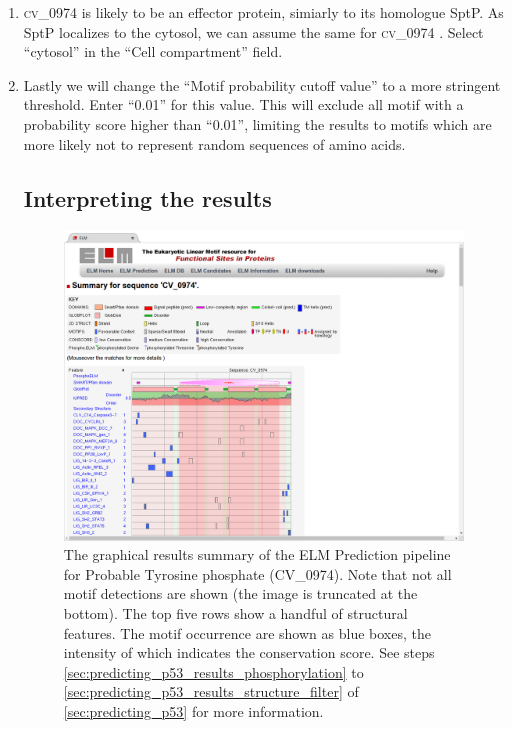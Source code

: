 \documentclass[12pt]{article}
\newcommand\uniprot[1]{%
	\textsc{\lowercase{#1}}%
}
\begin{document}
\begin{enumerate}
	
\item \uniprot{CV\_0974} is likely to be an effector protein, simiarly to its
    homologue SptP. As SptP localizes to the cytosol, we can assume the same
    for \uniprot{CV\_0974}. Select ``cytosol'' in the ``Cell compartment''
    field.

\item Lastly we will change the ``Motif probability cutoff value'' to a more
	stringent threshold. Enter ``0.01'' for this value. This will exclude 
	all motif with a probability score higher than ``0.01'', limiting the
	results to motifs which are more likely not to represent random
	sequences of amino acids.

\subsection*{Interpreting the results}
\label{subsec:predicting_cv_0974_submitting}

\begin{figure}[h!]
	\centering
	\includegraphics[width=\textwidth]{Figures/predicting_cv_0974/elm_results_summary.png}
	\caption{
	The graphical results summary of the ELM Prediction pipeline for
	Probable Tyrosine phosphate (CV\_0974). Note that not all motif
	detections are shown (the image is truncated at the bottom). The top
	five rows show a handful of structural features. The motif occurrence
	are shown as blue boxes, the intensity of which indicates the
	conservation score. See steps
	\ref{sec:predicting_p53_results_phosphorylation} to
	\ref{sec:predicting_p53_results_structure_filter} of
	\ref{sec:predicting_p53}
	for more information.
	}
	\label{fig:predicting_cv_0974_results_summary}
\end{figure}


\end{enumerate}
\end{document}
